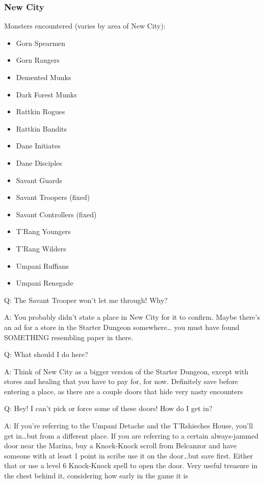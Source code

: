\documentclass[12pt]{article}
\providecommand{\tightlist}{%
  \setlength{\itemsep}{0pt}\setlength{\parskip}{0pt}}
\begin{document}
\subsubsection{New City}\label{new-city}

Monsters encountered (varies by area of New City):

\begin{itemize}
\tightlist
\item
  Gorn Spearmen
\item
  Gorn Rangers
\item
  Demented Munks
\item
  Dark Forest Munks
\item
  Rattkin Rogues
\item
  Rattkin Bandits
\item
  Dane Initiates
\item
  Dane Disciples
\item
  Savant Guards
\item
  Savant Troopers (fixed)
\item
  Savant Controllers (fixed)
\item
  T'Rang Youngers
\item
  T'Rang Wilders
\item
  Umpani Ruffians
\item
  Umpani Renegade
\end{itemize}

Q: The Savant Trooper won't let me through! Why?

A: You probably didn't state a place in New City for it to confirm.
Maybe there's an ad for a store in the Starter Dungeon somewhere\ldots{}
you must have found SOMETHING resembling paper in there.

Q: What should I do here?

A: Think of New City as a bigger version of the Starter Dungeon, except
with stores and healing that you have to pay for, for now. Definitely
save before entering a place, as there are a couple doors that hide very
nasty encounters

Q: Hey! I can't pick or force some of these doors! How do I get in?

A: If you're referring to the Umpani Detache and the T'Rshieches House,
you'll get in\ldots{}but from a different place. If you are referring to
a certain always-jammed door near the Marina, buy a Knock-Knock scroll
from Belcanzor and have someone with at least 1 point in scribe use it
on the door\ldots{}but save first. Either that or use a level 6
Knock-Knock spell to open the door. Very useful treasure in the chest
behind it, considering how early in the game it is
\end{document}
